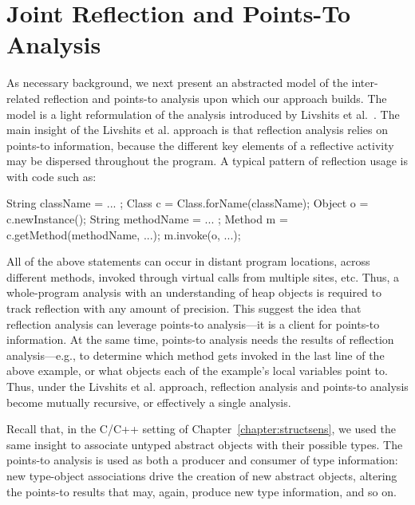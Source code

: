 \section{Joint Reflection and Points-To Analysis}
\label{reflection/sec:model}

As necessary background, we next present an abstracted model of the
inter-related reflection and points-to analysis upon which our
approach builds. The model is a light reformulation of the analysis
introduced by Livshits et
al.~\cite{aplas/LivshitsWL05,livshits:thesis}.  The main insight of
the Livshits et al. approach is that reflection analysis relies on
points-to information, because the different key elements of a
reflective activity may be dispersed throughout the program. A typical
pattern of reflection usage is with code such as:

\begin{javacodelinum}
String className = ... ;
Class c = Class.forName(className);
Object o = c.newInstance();
String methodName = ... ;
Method m = c.getMethod(methodName, ...);
m.invoke(o, ...);
\end{javacodelinum}

All of the above statements can occur in distant program locations,
across different methods, invoked through virtual calls from multiple
sites, etc. Thus, a whole-program analysis with an understanding of
heap objects is required to track reflection with any amount of
precision. This suggest the idea that reflection analysis can leverage
points-to analysis---it is a client for points-to information. At the
same time, points-to analysis needs the results of reflection
analysis---e.g., to determine which method gets invoked in the last
line of the above example, or what objects each of the example's local
variables point to. Thus, under the Livshits et al. approach,
reflection analysis and points-to analysis become mutually recursive,
or effectively a single analysis.

Recall that, in the C/C++ setting of Chapter~\ref{chapter:structsens},
we used the same insight to associate untyped abstract objects with
their possible types. The points-to analysis is used as both a
producer and consumer of type information: new type-object
associations drive the creation of new abstract objects, altering the
points-to results that may, again, produce new type information, and so
on.


